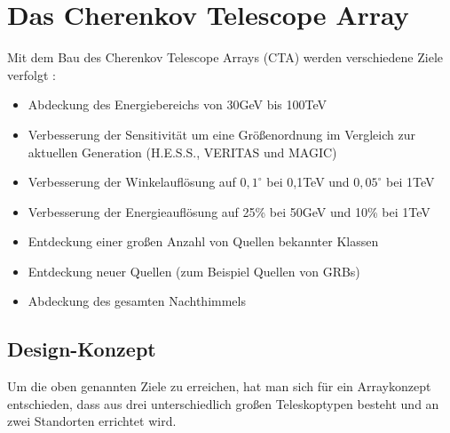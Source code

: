 \chapter{Das Cherenkov Telescope Array}
\label{ch:CTA}
Mit dem Bau des Cherenkov Telescope Arrays (CTA) werden verschiedene Ziele verfolgt \cite{NextGen}:
\begin{itemize}

\item Abdeckung des Energiebereichs von 30GeV bis 100TeV
\item Verbesserung der Sensitivität um eine Größenordnung im Vergleich zur aktuellen Generation (H.E.S.S., VERITAS und MAGIC)
\item Verbesserung der Winkelauflösung auf $0,1^{\circ}$ bei 0,1TeV und $0,05^{\circ}$ bei 1TeV
\item Verbesserung der Energieauflösung auf 25\% bei 50GeV und 10\% bei 1TeV
\item Entdeckung einer großen Anzahl von Quellen bekannter Klassen
\item Entdeckung neuer Quellen (zum Beispiel Quellen von GRBs)
\item Abdeckung des gesamten Nachthimmels %
\end{itemize}

\section{Design-Konzept}
Um die oben genannten Ziele zu erreichen, hat man sich für ein Arraykonzept entschieden, dass aus drei unterschiedlich großen Teleskoptypen besteht und an zwei Standorten errichtet wird.

